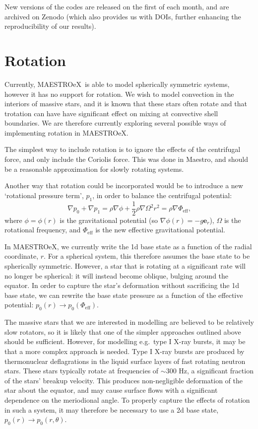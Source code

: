 \documentclass[a4paper]{jpconf}
\newcommand{\maestro}{{\sffamily Maestro}}
\newcommand{\maestroex}{{\sffamily MAESTROeX}}
\begin{document}
New versions of the codes are released on the first of each month, and are archived on Zenodo (which also provides us with DOIs, further enhancing the reproducibility of our results).


\section{Rotation} \label{sec:rotation}
Currently, \maestroex~is able to model spherically symmetric systems, however it has no support for rotation. We wish to model convection in the interiors of massive stars, and it is known that these stars often rotate and that trotation can have have significant effect on mixing at convective shell boundaries. We are therefore currently exploring several possible ways of implementing rotation in \maestroex. 

The simplest way to include rotation is to ignore the effects of the centrifugal force, and only include the Coriolis force. This was done in \maestro, and should be a reasonable approximation for slowly rotating systems. 

Another way that rotation could be incorporated would be to introduce a new `rotational pressure term', $p_1$, in order to balance the centrifugal potential:
\begin{equation}
    \nabla p_0 + \nabla p_1 = \rho \nabla \phi + \frac{1}{2}\rho \nabla\Omega^2 r^2 = \rho \nabla \Phi_{\text{eff}},
\end{equation}
where $\phi = \phi(r)$ is the gravitational potential (so $\nabla \phi(r) = -g \bm{e}_r$), $\Omega$ is the rotational frequency, and $\Phi_{\text{eff}}$ is the new effective gravitational potential. 

In \maestroex, we currently write the 1d base state as a function of the radial coordinate, $r$. For a spherical system, this therefore assumes the base state to be spherically symmetric. However, a star that is rotating at a significant rate will no longer be spherical: it will instead become oblique, bulging around the equator. In order to capture the star's deformation without sacrificing the 1d base state, we can rewrite the base state pressure as a function of the effective potential: $p_0(r)\rightarrow p_0(\Phi_{\text{eff}})$. 

The massive stars that we are interested in modelling are believed to be relatively slow rotators, so it is likely that one of the simpler approaches outlined above should be sufficient. However, for modelling e.g.~type I X-ray bursts, it may be that a more complex approach is needed. Type I X-ray bursts are produced by thermonuclear deflagrations in the liquid surface layers of fast rotating neutron stars. These stars typically rotate at frequencies of $\sim$300 Hz, a significant fraction of the stars' breakup velocity. This produces non-negligible deformation of the star about the equator, and may cause surface flows with a significant dependence on the meriodional angle. To properly capture the effects of rotation in such a system, it may therefore be necessary to use a 2d base state, $p_0(r)\rightarrow p_0(r, \theta)$. 
\end{document}
